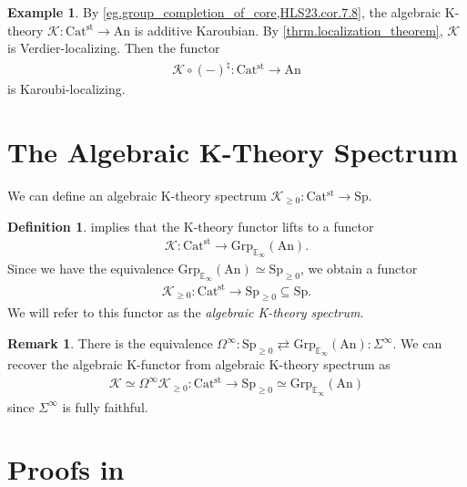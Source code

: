 \documentclass[a4paper,dvipdfmx,11pt,reqno]{amsart}
\newcommand{\K}{\mathcal{K}}
\newcommand{\An}{\mathrm{An}}
\newcommand{\Catst}{\mathrm{Cat^{st}}}
\newcommand{\Grp}{\mathrm{Grp}_{\mathbb{E}_{\infty}}}
\newcommand{\Sp}{\mathrm{Sp}}
\theoremstyle{definition}
\newtheorem{definition}[theorem]{Definition}
\newtheorem{example}[theorem]{Example}
\newtheorem{remark}[theorem]{Remark}
\begin{document}
\begin{example} \label{Ber.cor.5.52}
  By \cref{eg.group_completion_of_core,HLS23.cor.7.8}, the algebraic K-theory $\K : \Catst \to \An$ is additive Karoubian.
  By \cref{thrm.localization_theorem}, $\K$ is Verdier-localizing.
  Then the functor 
  \begin{align*}
    \K \circ (-)^{\natural} : \Catst \to \An
  \end{align*}
  is Karoubi-localizing.
\end{example}


\section{The Algebraic K-Theory Spectrum}

We can define an algebraic K-theory spectrum $\K_{\geq 0} : \Catst \to \Sp$.

\begin{definition}
   implies that the K-theory functor lifts to a functor 
  \begin{align*}
    \K : \Catst \to \Grp(\An).
  \end{align*}
  Since we have the equivalence $\Grp(\An) \simeq \Sp_{\geq 0}$, we obtain a functor 
  \begin{align*}
    \K_{\geq 0} : \Catst \to \Sp_{\geq 0} \subseteq \Sp.
  \end{align*}
  We will refer to this functor as the \textit{algebraic K-theory spectrum}.
\end{definition}

\begin{remark}
  There is the equivalence $\Omega^\infty : \Sp_{\geq 0} \rightleftarrows \Grp(\An) : \Sigma^\infty$.
  We can recover the algebraic K-functor from algebraic K-theory spectrum as 
  \begin{align*}
    \K \simeq \Omega^\infty \K_{\geq 0} :  \Catst \to \Sp_{\geq 0} \simeq \Grp(\An) 
  \end{align*}
  since $\Sigma^\infty$ is fully faithful.
\end{remark}

\newpage
\appendix


\section{Proofs in }
\end{document}
